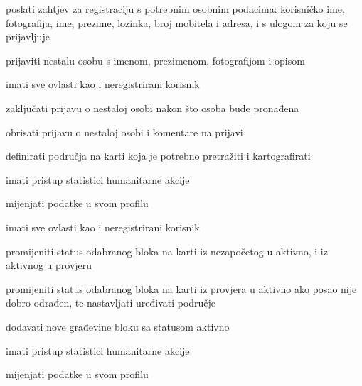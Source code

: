 			
			\begin{packed_enum}
				\item  {}
				
				\begin{packed_enum}
					
					\item poslati zahtjev za registraciju s potrebnim osobnim podacima: korisničko ime, fotografija, ime, prezime, lozinka, broj mobitela i adresa, i s ulogom za koju se prijavljuje
					\item prijaviti nestalu osobu s imenom, prezimenom, fotografijom i opisom
					
					
				\end{packed_enum}
			
				\item  {}
				
				\begin{packed_enum}

                        \item imati sve ovlasti kao i neregistrirani korisnik
					\item zaključati prijavu o nestaloj osobi nakon što osoba bude pronađena
					\item obrisati prijavu o nestaloj osobi i komentare na prijavi
					\item definirati područja na karti koja je potrebno pretražiti i kartografirati
					\item imati pristup statistici humanitarne akcije
					\item mijenjati podatke u svom profilu

					
				\end{packed_enum}
				
				\item  {}
				
				\begin{packed_enum}
    
					\item imati sve ovlasti kao i neregistrirani korisnik
					\item promijeniti status odabranog bloka na karti iz nezapočetog u aktivno, i iz aktivnog u provjeru
					\item promijeniti status odabranog bloka na karti iz provjera u aktivno ako posao nije dobro odrađen, te nastavljati uređivati područje
					\item dodavati nove građevine bloku sa statusom aktivno
					\item imati pristup statistici humanitarne akcije
					\item mijenjati podatke u svom profilu



\end{packed_enum}
\end{packed_enum}
